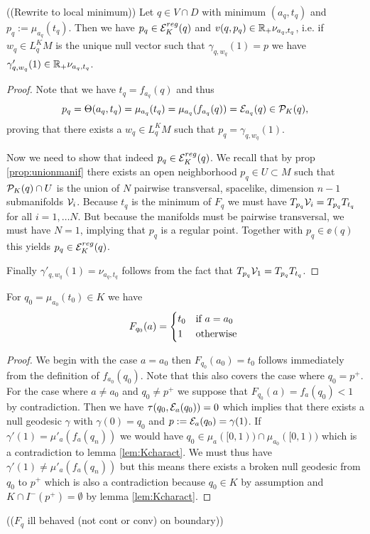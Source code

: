\begin{lemma}\label{lem:amin} ((Rewrite to local minimum))
    Let $q\in V\cap D$ with minimum $(a_q,t_q)$ and $p_q:=\mu_{a_q}(t_q)$. Then we have $p_q\in {{\mathcal{E}}^{reg}_K}(q)$ and $v(q,p_q)\in \mathbb{R}_+\nu_{a_q,t_q}$, i.e. if $w_q\in L^K_qM$ is the unique null vector such that $\gamma_{q,w_q}(1)=p$ we have $\gamma'_{q,w_q}(1)\in \mathbb{R}_+\nu_{a_q,t_q}$.
\end{lemma}
\begin{proof}
    Note that we have $t_q = f_{a_q}(q)$ and thus 
    \[
        p_q = \Theta(a_q,t_q)=\mu_{a_q}(t_q) = \mu_{a_q}(f_{a_q}(q)) = {\mathcal{E}}_{a_q}(q)\in {{\mathcal{P}}_K(q)},
    \] proving that there exists a $w_q\in L^K_qM$ such that $p_q = \gamma_{q,w_q}(1)$. 

    Now we need to show that indeed $p_q\in {{\mathcal{E}}^{reg}_K}(q)$.
    We recall that by prop \ref{prop:unionmanif} there exists an open neighborhood $p_q\in U\subset M$ such that ${\mathcal{P}}_K(q)\cap U$ is the union of $N$ pairwise transversal, spacelike, dimension $n-1$ submanifolds ${\mathcal{V}}_i$. Because $t_q$ is the minimum of $F_q$ we must have $T_{p_q}{{\mathcal{V}}_i} = T_{p_q}{T_{t_q}}$ for all $i=1,\dots N$. But because the manifolds must be pairwise transversal, we must have $N=1$, implying that $p_q$ is a regular point. Together with $p_q\in \ee(q)$ this yields $p_q \in {{\mathcal{E}}^{reg}_K}(q)$.

    Finally $\gamma'_{q,w_q}(1)=\nu_{a_q,t_q}$ follows from the fact that $T_{p_q}{{\mathcal{V}}_1} = T_{p_q}{T_{t_q}}$.
\end{proof}

\begin{lemma}\label{lem:boundaryF}
    For $q_0=\mu_{a_0}(t_0)\in K$ we have 
    \begin{equation*}
        F_{q_0}(a) = 
        \begin{cases*}
            t_0 & if $a=a_0$ \\
            1 & otherwise
        \end{cases*}
    \end{equation*}
\end{lemma}
\begin{proof}
    We begin with the case $a=a_0$ then $F_{q_0}(a_0)=t_0$ follows immediately from the definition of $f_{a_0}(q_0)$. Note that this also covers the case where $q_0=p^+$. For the case where $a\neq a_0$ and $q_0\neq p^+$ we suppose that $F_{q_0}(a)=f_a(q_0)<1$ by contradiction. Then we have $\tau(q_0,{\mathcal{E}}_a(q_0))=0$ which implies that there exists a null geodesic $\gamma$ with $\gamma(0)=q_0$ and $p:={\mathcal{E}}_a(q_0)=\gamma(1)$. If $\gamma'(1)=\mu'_a(f_a(q_n))$ we would have $q_0\in \mu_a([0,1)) \cap \mu_{a_0}([0,1))$ which is a contradiction to lemma \ref{lem:Kcharact}. We must thus have $\gamma'(1)\neq\mu'_a(f_a(q_n))$ but this means there exists a broken null geodesic from $q_0$ to $p^+$ which is also a contradiction because $q_0\in K$ by assumption and $K\cap I^-(p^+)=\emptyset$ by lemma \ref{lem:Kcharact}.
\end{proof}
\begin{remark}
    (($F_q$ ill behaved (not cont or conv) on boundary))
\end{remark}

